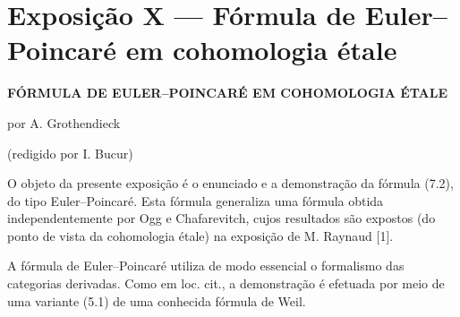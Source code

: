\section*{Exposição X --- Fórmula de Euler--Poincaré em cohomologia étale}

\begin{center}
\textbf{FÓRMULA DE EULER--POINCARÉ EM COHOMOLOGIA ÉTALE}

por A. Grothendieck

(redigido por I. Bucur)
\end{center}

O objeto da presente exposição é o enunciado e a demonstração da fórmula (7.2), do tipo Euler--Poincaré. Esta fórmula generaliza uma fórmula obtida independentemente por Ogg e Chafarevitch, cujos resultados são expostos (do ponto de vista da cohomologia étale) na exposição de M. Raynaud [1].

A fórmula de Euler--Poincaré utiliza de modo essencial o formalismo das categorias derivadas. Como em loc. cit., a demonstração é efetuada por meio de uma variante (5.1) de uma conhecida fórmula de Weil.
